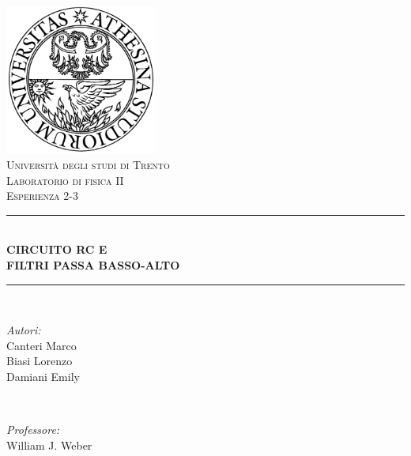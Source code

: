 \begin{titlepage}

\newcommand{\HRule}{\rule{\linewidth}{0.5mm}} %

\center %
 
\includegraphics[width = 50mm]{unitn.jpg}\\[0.5cm]
\textsc{\LARGE Università degli studi di Trento}\\[1.5cm] %
\textsc{\Large Laboratorio di fisica II}\\[0.5cm] %
\textsc{\large Esperienza 2-3}\\[0.5cm] %


\HRule \\[0.2cm]
{ \huge \bfseries CIRCUITO RC E\\[0.1cm]FILTRI PASSA BASSO-ALTO}\\ %
\HRule \\[1.5cm]
 

\begin{minipage}{0.4\textwidth}
\begin{flushleft} \large
\emph{Autori:}\\
Canteri Marco\\Biasi Lorenzo\\Damiani Emily %
\end{flushleft}
\end{minipage}
~
\begin{minipage}{0.4\textwidth}
\begin{flushright} \large
\emph{Professore:} \\
William J. Weber %
\end{flushright}
\end{minipage}\\[1.5cm]


\end{titlepage}
